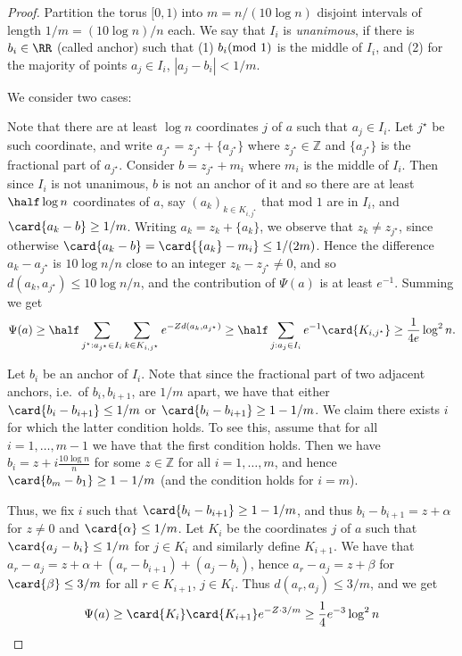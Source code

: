 \begin{proof}
 Partition the torus $[0,1)$ into $m = n/(10 \log n)$ disjoint intervals of length $1/m = (10 \log n)/n$ each.
 We say that $I_i$ is {\em unanimous}, if there is $b_i\in \RR$ (called anchor) such that
 (1) $b_i\hspace{-1ex}\pmod{1}$ is the middle of $I_i$, and (2) for the majority of points $a_j\in I_i$, $|a_j-b_i|< 1/m$.

 We consider two cases:

 Note that there are at least $\log n$ coordinates $j$ of $a$ such that $a_j\in I_i$.
Let $j^{\star}$ be such coordinate, and write $a_{j^{\star}} = z_{j^{\star}} + \{a_{j^{\star}}\}$ where $z_{j^{\star}}\in\mathbb{Z}$ and
$\{a_{j^{\star}}\}$ is the fractional part of $a_{j^{\star}}$. Consider
$b = z_{j^{\star}} + m_i$ where $m_i$ is the middle of $I_i$. Then since $I_i$ is not unanimous, $b$ is not an anchor of it and so there are at least $\half \log n$
coordinates of $a$, say $(a_k)_{k\in K_{i,j^{\star}}}$ that mod $1$ are in $I_i$, and $\card{a_k - b}\geq 1/m$. Writing $a_k = z_k + \{a_k\}$, we observe that $z_k\neq z_{j^{\star}}$,
since otherwise $\card{a_k - b}= \card{\{a_k\} - m_i} \leq 1/(2m)$. Hence the difference $a_k-a_{j^{\star}}$
is $10\log n/n$ close to an integer $z_k-z_{j^{\star}}\neq 0$, and so $d(a_k,a_{j^{\star}})\leq 10\log n/n$, and the contribution of $\Psi(a)$ is
at least $e^{-1}$. Summing we get
\[
\Psi(a)\geq
\half
\sum\limits_{j^{\star}: a_{j^{\star}} \in I_i}
\sum\limits_{k\in K_{i,j^{\star}}}{e^{-Z d(a_k,a_{j^{\star}})}}
\geq
\half
\sum\limits_{j: a_j \in I_i}
e^{-1} \card{K_{i,j^{\star}}}
\geq \frac{1}{4e} \log^2 n.
\]

 Let $b_i$ be an anchor of $I_i$. Note that since the fractional part of two adjacent anchors,
i.e.\ of $b_i,b_{i+1}$, are $1/m$ apart, we have that either $\card{b_i - b_{i+1}}\leq 1/m$ or $\card{b_i-b_{i+1}}\geq 1-1/m$. We claim there exists $i$ for
which the latter condition holds. To see this, assume that for all $i=1,\ldots,m-1$ we have that the first condition holds. Then we have
$b_i = z + i \frac{10\log n}{n}$ for some $z\in \mathbb{Z}$ for all $i=1,\ldots,m$, and hence $\card{b_m - b_1}\geq 1-1/m$ (and the condition holds for $i=m$).

Thus, we fix $i$ such that $\card{b_i-b_{i+1}}\geq 1-1/m$, and thus $b_i - b_{i+1} = z + \alpha$ for $z\neq 0$ and $\card{\alpha}\leq 1/m$.
Let $K_i$ be the coordinates $j$ of $a$ such that $\card{a_j - b_i}\leq 1/m$ for $j\in K_i$
and similarly define $K_{i+1}$.
We have that $a_r - a_j = z + \alpha + (a_r - b_{i+1}) + (a_j - b_i)$, hence $a_r - a_j = z + \beta$ for $\card{\beta}\leq 3/m$ for all $r\in K_{i+1}$, $j\in K_i$.
Thus $d(a_r,a_j)\leq 3/m$, and we get
\[
\Psi(a)\geq \card{K_i}\card{K_{i+1}} e^{-Z\cdot 3/m}\geq \frac{1}{4} e^{-3} \log^2 n\qedhere
\]
\end{proof}


